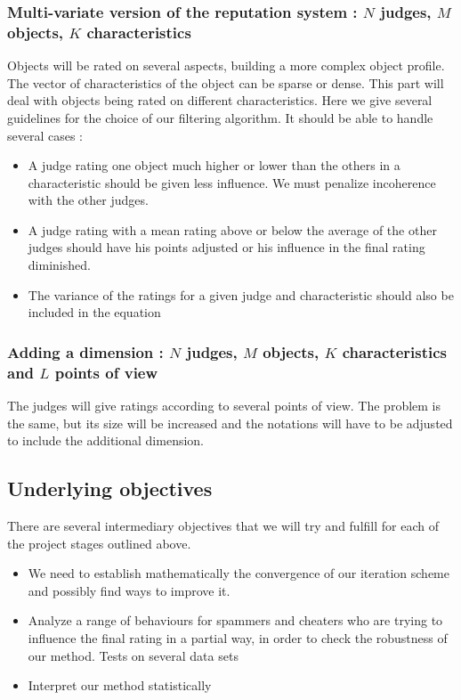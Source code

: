 \documentclass[12pt,a4paper]{article}
\begin{document}
\subsubsection*{Multi-variate version of the reputation system : $N$ judges, $M$ objects, $K$ characteristics}
Objects will be rated on several aspects, building a more complex object profile. The vector of characteristics of the object can be sparse or dense.
This part will deal with objects being rated on different characteristics. 
Here we give several guidelines for the choice of our filtering algorithm. It should be able to handle several cases :
\begin{itemize}
\item A judge rating one object much higher or lower than the others in a characteristic should be given less influence. We must penalize incoherence with the other judges.
\item A judge rating with a mean rating above or below the average of the other judges should have his points adjusted or his influence in the final rating diminished.
\item The variance of the ratings for a given judge and characteristic should also be included in the equation
\end{itemize}

\subsubsection*{Adding a dimension : $N$ judges, $M$ objects, $K$ characteristics and $L$ points of view}
The judges will give ratings according to several points of view. The problem is the same, but its size will be increased and the notations will have to be adjusted to include the additional dimension.
\subsection*{Underlying objectives}
There are several intermediary objectives that we will try and fulfill for each of the project stages outlined above.
\begin{itemize}
\item We need to establish mathematically the convergence of our iteration scheme and possibly find ways to improve it.
\item Analyze a range of behaviours for spammers and cheaters who are trying to influence the final rating in a partial way, in order to check the robustness of our method. Tests on several data sets
\item Interpret our method statistically
\end{itemize}
\end{document}
